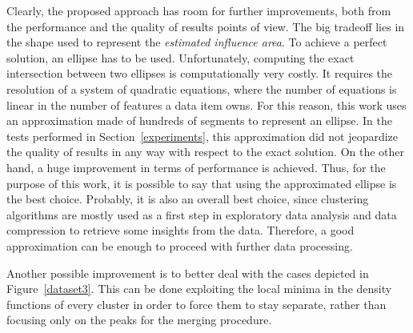 Clearly, the proposed approach has room for further improvements, both from
the performance and the quality of results points of view. The big tradeoff
lies in the shape used to represent the \emph{estimated influence area}. To
achieve a perfect solution, an ellipse has to be used. Unfortunately, computing
the exact intersection between two ellipses is computationally very costly.
It requires the resolution of a system of quadratic equations, where the number
of equations is linear in the number of features a data item owns.
For this reason, this work uses an approximation made of hundreds of segments
to represent an ellipse. In the tests performed in Section~\ref{experiments},
this approximation did not jeopardize the quality of results in any way with
respect to the exact solution. On the other hand, a huge improvement in terms
of performance is achieved. Thus, for the purpose of this work, it is possible
to say that using the approximated ellipse is the best choice. Probably, it is
also an overall best choice, since clustering algorithms are mostly used as 
a first step in exploratory data analysis and data compression to retrieve 
some insights from the data. Therefore, a good approximation can be enough 
to proceed with further data processing.

Another possible improvement is to better deal with the cases depicted in
Figure~\ref{dataset3}. This can be done exploiting the local minima
in the density functions of every cluster in order to force them to stay 
separate, rather than focusing only on the peaks for the merging procedure.